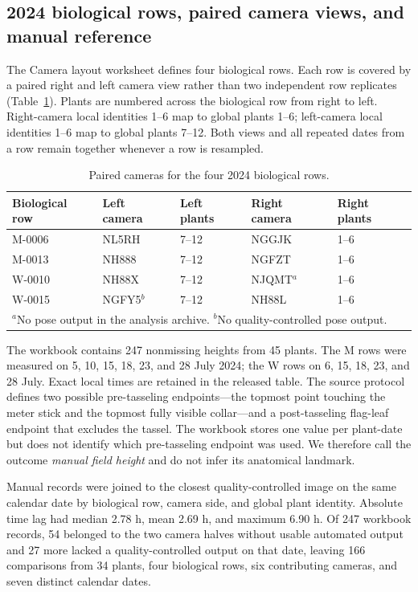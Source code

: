 \documentclass[review,12pt,authoryear]{elsarticle}
\begin{document}
\subsection{2024 biological rows, paired camera views, and manual reference}

The Camera layout worksheet defines four biological rows. Each row is covered by a paired right and left camera view rather than two independent row replicates (Table~\ref{tab:cameras}). Plants are numbered across the biological row from right to left. Right-camera local identities 1--6 map to global plants 1--6; left-camera local identities 1--6 map to global plants 7--12. Both views and all repeated dates from a row remain together whenever a row is resampled.

\begin{table}[htbp]
\caption{Paired cameras for the four 2024 biological rows.}
\label{tab:cameras}
\centering\small
\begin{tabular}{lllll}
\toprule
Biological row & Left camera & Left plants & Right camera & Right plants \\
\midrule
M-0006 & NL5RH & 7--12 & NGGJK & 1--6 \\
M-0013 & NH888 & 7--12 & NGFZT & 1--6 \\
W-0010 & NH88X & 7--12 & NJQMT$^{a}$ & 1--6 \\
W-0015 & NGFY5$^{b}$ & 7--12 & NH88L & 1--6 \\
\bottomrule
\multicolumn{5}{l}{\footnotesize $^{a}$No pose output in the analysis archive. $^{b}$No quality-controlled pose output.}
\end{tabular}
\end{table}

The workbook contains 247 nonmissing heights from 45 plants. The M rows were measured on 5, 10, 15, 18, 23, and 28 July 2024; the W rows on 6, 15, 18, 23, and 28 July. Exact local times are retained in the released table. The source protocol defines two possible pre-tasseling endpoints---the topmost point touching the meter stick and the topmost fully visible collar---and a post-tasseling flag-leaf endpoint that excludes the tassel. The workbook stores one value per plant-date but does not identify which pre-tasseling endpoint was used. We therefore call the outcome \emph{manual field height} and do not infer its anatomical landmark.

Manual records were joined to the closest quality-controlled image on the same calendar date by biological row, camera side, and global plant identity. Absolute time lag had median 2.78 h, mean 2.69 h, and maximum 6.90 h. Of 247 workbook records, 54 belonged to the two camera halves without usable automated output and 27 more lacked a quality-controlled output on that date, leaving 166 comparisons from 34 plants, four biological rows, six contributing cameras, and seven distinct calendar dates.
\end{document}
